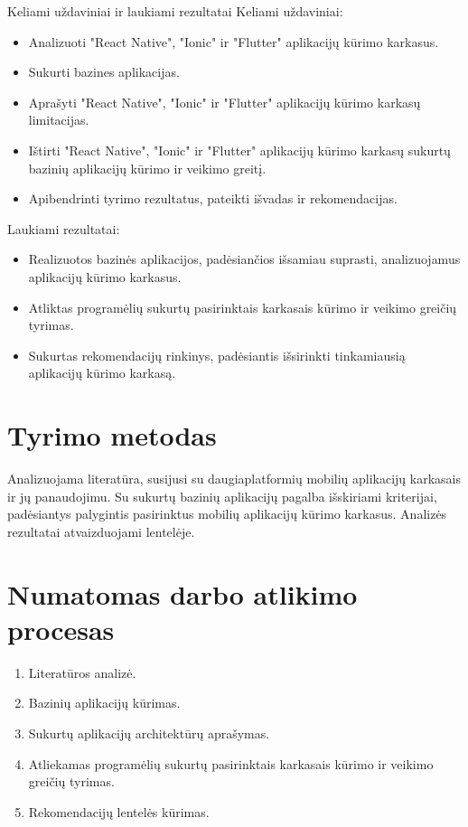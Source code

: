 \documentclass{VUMIFInfBakalaurinis}
\begin{document}
\begin {section}{Keliami uždaviniai ir laukiami rezultatai}
Keliami uždaviniai:
\begin{itemize}
  \item Analizuoti "React Native", "Ionic" ir "Flutter" aplikacijų kūrimo karkasus.
  \item Sukurti bazines aplikacijas.
  \item Aprašyti "React Native", "Ionic" ir "Flutter" aplikacijų kūrimo karkasų limitacijas.
  \item Ištirti "React Native", "Ionic" ir "Flutter" aplikacijų kūrimo karkasų sukurtų bazinių aplikacijų kūrimo ir veikimo greitį.
  \item Apibendrinti tyrimo rezultatus, pateikti išvadas ir rekomendacijas.
\end{itemize}

Laukiami rezultatai:
\begin{itemize}
  \item Realizuotos bazinės aplikacijos, padėsiančios išsamiau suprasti, analizuojamus aplikacijų kūrimo karkasus.
  \item Atliktas programėlių sukurtų pasirinktais karkasais kūrimo ir veikimo greičių tyrimas.
  \item Sukurtas rekomendacijų rinkinys, padėsiantis išsirinkti tinkamiausią aplikacijų kūrimo karkasą.
\end{itemize}

\end{section}

\section{Tyrimo metodas}
Analizuojama literatūra, susijusi su daugiaplatformių mobilių aplikacijų karkasais ir jų panaudojimu. Su sukurtų bazinių aplikacijų pagalba išskiriami kriterijai, padėsiantys palygintis pasirinktus mobilių aplikacijų kūrimo karkasus. Analizės rezultatai atvaizduojami lentelėje.

\section{Numatomas darbo atlikimo procesas}
\begin{enumerate}
  \item Literatūros analizė.
  \item Bazinių aplikacijų kūrimas.
  \item Sukurtų aplikacijų architektūrų aprašymas.
  \item Atliekamas programėlių sukurtų pasirinktais karkasais kūrimo ir veikimo greičių tyrimas.
  \item Rekomendacijų lentelės kūrimas.
\end{enumerate}
\end{document}
